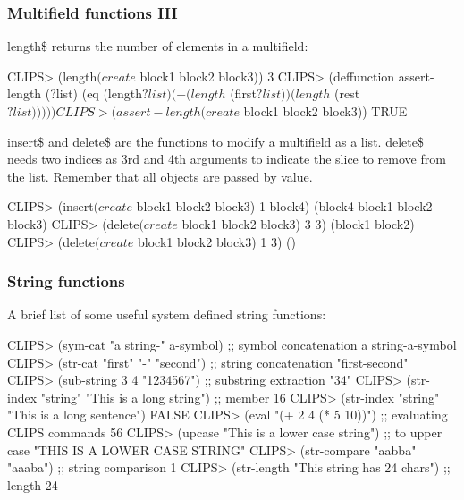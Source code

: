 \documentclass[xcolor={usenames,dvipsnames,svgnames}, compress]{beamer}
\begin{document}
\begin{frame}[fragile]
  \frametitle{Multifield functions III}
  \textsf{length\$} returns the number of elements in a multifield:
  \begin{clips-code}
    CLIPS> (length$ (create$ block1 block2 block3))
    3
    CLIPS> (deffunction assert-length (?list)
    (eq (length$ ?list) (+ (length$ (first$ ?list)) (length$ (rest$ ?list)))))
    CLIPS> (assert-length (create$ block1 block2 block3))
    TRUE
  \end{clips-code}\bigskip

    \textsf{insert\$} and \textsf{delete\$} are the functions to modify
    a multifield as a list. \textsf{delete\$} needs two indices as 3rd
    and 4th arguments to indicate the slice to remove from the list. Remember that all
    objects are passed by value.
    \begin{clips-code}
      CLIPS> (insert$ (create$ block1 block2 block3) 1 block4)
      (block4 block1 block2 block3)
      CLIPS> (delete$ (create$ block1 block2 block3) 3 3)
      (block1 block2)
      CLIPS> (delete$ (create$ block1 block2 block3) 1 3)
      ()
    \end{clips-code}
\end{frame}

\begin{frame}[fragile]
  \frametitle{String functions}
  A brief list of some useful system defined string functions:
  \begin{clips-code}
    CLIPS> (sym-cat "a string-" a-symbol) ;; symbol concatenation
    a string-a-symbol
    CLIPS> (str-cat "first" "-" "second") ;; string concatenation
    "first-second"
    CLIPS> (sub-string 3 4 "1234567") ;; substring extraction
    "34"
    CLIPS> (str-index "string" "This is a long string") ;; member
    16
    CLIPS> (str-index "string" "This is a long sentence")
    FALSE
    CLIPS> (eval "(+ 2 4 (* 5 10))") ;; evaluating CLIPS commands
    56
    CLIPS> (upcase "This is a lower case string") ;; to upper case
    "THIS IS A LOWER CASE STRING"
    CLIPS> (str-compare "aabba" "aaaba") ;; string comparison
    1
    CLIPS> (str-length "This string has 24 chars") ;; length
    24
  \end{clips-code}
\end{frame}
\end{document}

